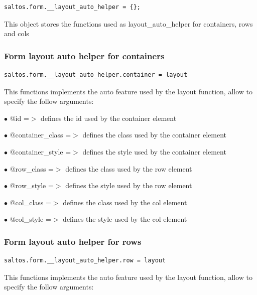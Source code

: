 \documentclass[a4paper]{article}
\begin{document}
\begin{lstlisting}
saltos.form.__layout_auto_helper = {};
\end{lstlisting}

This object stores the functions used as layout\_auto\_helper for containers, rows and cols

\hypertarget{toc223}{}
\subsubsection{Form layout auto helper for containers}

\begin{lstlisting}
saltos.form.__layout_auto_helper.container = layout
\end{lstlisting}

This functions implements the auto feature used by the layout function, allow to specify the
follow arguments:

\begin{compactitem}
\item[\color{myblue}$\bullet$] @id              =$>$ defines the id used by the container element
\item[\color{myblue}$\bullet$] @container\_class =$>$ defines the class used by the container element
\item[\color{myblue}$\bullet$] @container\_style =$>$ defines the style used by the container element
\item[\color{myblue}$\bullet$] @row\_class       =$>$ defines the class used by the row element
\item[\color{myblue}$\bullet$] @row\_style       =$>$ defines the style used by the row element
\item[\color{myblue}$\bullet$] @col\_class       =$>$ defines the class used by the col element
\item[\color{myblue}$\bullet$] @col\_style       =$>$ defines the style used by the col element
\end{compactitem}

\hypertarget{toc224}{}
\subsubsection{Form layout auto helper for rows}

\begin{lstlisting}
saltos.form.__layout_auto_helper.row = layout
\end{lstlisting}

This functions implements the auto feature used by the layout function, allow to specify the
follow arguments:
\end{document}
